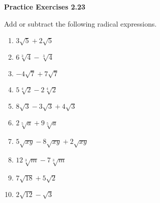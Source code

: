 \vspace{1ex}
\noindent\textbf{Practice Exercises 2.23}

\vspace{0.75ex}

Add or subtract the following radical expressions.

\begin{multicols}{2}
\begin{enumerate}[noitemsep, label = \color{blue}\arabic*. ]
    \item $3\sqrt{5} + 2\sqrt{5}$
    \item $6\sqrt[{\scriptstyle 3}]{4} - \sqrt[{\scriptstyle 3}]{4}$
    \item $-4\sqrt{7} + 7\sqrt{7}$
    \item $5\sqrt[{\scriptstyle 4}]{2} - 2\sqrt[{\scriptstyle 4}]{2}$
    \item $8\sqrt{3} - 3\sqrt{3} + 4\sqrt{3}$
    \item $2\sqrt[{\scriptstyle 5}]{a} + 9\sqrt[{\scriptstyle 5}]{a}$
    \item $5\sqrt{xy} - 8\sqrt{xy} + 2\sqrt{xy}$
    \item $12\sqrt[{\scriptstyle 3}]{m} - 7\sqrt[{\scriptstyle 3}]{m}$
    \item $7\sqrt{18} + 5\sqrt{2}$
    \item $2\sqrt{12} - \sqrt{3}$
\end{enumerate}
\end{multicols}
